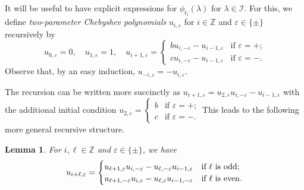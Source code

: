 \documentclass{amsart}
\newtheorem{lemma}[theorem]{Lemma}
\numberwithin{theorem}{section}
\newcommand{\cI}{\mathcal{I}}
\newcommand{\ZZ}{\mathbb{Z}}
\begin{document}
  It will be useful to have explicit expressions for $\phi_{t_i}(\lambda)$ for $\lambda\in\cI$.
  For this, we define \emph{two-parameter Chebyshev polynomials} $u_{i,\varepsilon}$ for $i\in\ZZ$ and $\varepsilon\in\{\pm\}$ recursively by
  \[u_{0,\varepsilon}=0,\quad u_{1,\varepsilon}=1,\quad u_{i+1,\varepsilon}=\begin{cases} bu_{i,-\varepsilon}-u_{i-1,\varepsilon} & \text{if $\varepsilon=+$;}\\ cu_{i,-\varepsilon}-u_{i-1,\varepsilon} & \text{if $\varepsilon=-$.} \end{cases}\]
  Observe that, by an easy induction, $u_{-i,\varepsilon}=-u_{i,\varepsilon}$.

  The recursion can be written more succinctly as $u_{i+1,\varepsilon}=u_{2,\varepsilon}u_{i,-\varepsilon}-u_{i-1,\varepsilon}$ with the additional initial condition $u_{2,\varepsilon}=\begin{cases} b & \text{if $\varepsilon=+$;}\\ c & \text{if $\varepsilon=-$.} \end{cases}$
  This leads to the following more general recursive structure.
  \begin{lemma}
    For $i,\ell\in\ZZ$ and $\varepsilon\in\{\pm\}$, we have
    \begin{equation}
      \label{eq:long Chebyshev recursion}
      u_{i+\ell,\varepsilon}=\begin{cases} u_{\ell+1,\varepsilon}u_{i,-\varepsilon}-u_{\ell,-\varepsilon}u_{i-1,\varepsilon} & \text{\upshape if $\ell$ is odd;}\\ u_{\ell+1,-\varepsilon}u_{i,\varepsilon}-u_{\ell,\varepsilon}u_{i-1,-\varepsilon} & \text{\upshape if $\ell$ is even.} \end{cases}
    \end{equation}
  \end{lemma}
\end{document}
